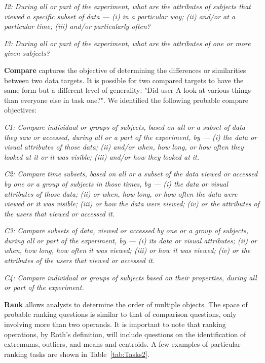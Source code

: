 \vspace{2mm}
\hangindent=3mm\textit{I2: During all or part of the experiment, what are the attributes of subjects that viewed a specific subset of data --- (i) in a particular way; (ii) and/or at a particular time; (iii) and/or particularly often?} 

\vspace{2mm}
\hangindent=3mm\textit{I3: During all or part of the experiment, what are the attributes of one or more given subjects?} 


\vspace{2mm}
\noindent\textbf{Compare} captures the objective of determining the differences or similarities between two data targets. It is possible for two compared targets to have the same form but a different level of generality: "Did user A look at various things than everyone else in task one?". We identified the following probable compare objectives: 

\vspace{2mm}
\hangindent=3mm\textit{C1: Compare individual or groups of subjects, based on all or a subset of data they saw or accessed, during all or a part of the experiment, by --- (i) the data or visual attributes of those data; (ii) and/or when, how long, or how often they looked at it or it was visible; (iii) and/or how they looked at it.}

\vspace{2mm}
\hangindent=3mm\textit{C2: Compare time subsets, based  on all or a subset of the data viewed or accessed by one or a group of subjects in those times, by --- (i) the data or visual attributes of those data; (ii) or when, how long, or how often the data were viewed or it was visible; (iii) or how the data were viewed; (iv) or the attributes of the users that viewed or accessed it.}

\vspace{2mm}
\hangindent=3mm\textit{C3: Compare subsets of data, viewed or accessed by one or a group of subjects, during all or part of the experiment, by --- (i) its data or visual attributes; (ii) or when, how long, how often it was viewed; (iii) or how it was viewed; (iv) or the attributes of the users that viewed or accessed it.}
	
\vspace{2mm}
\hangindent=3mm\textit{C4: Compare individual or groups of subjects based on their properties, during all or part of the experiment.}

\vspace{2mm}
\noindent\textbf{Rank} allows analysts to determine the order of multiple objects. The space of probable ranking questions is similar to that of comparison questions, only involving more than two operands. It is important to note that ranking operations, by Roth's definition, will include questions on the identification of extremums, outliers, and means and centroids. A few examples of particular ranking tasks are shown in Table~\ref{tab:Tasks2}. 


